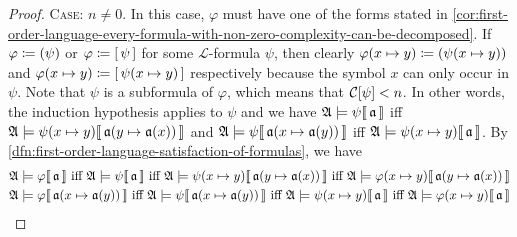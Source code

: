 \begin{proof}
    \vspace{0.3cm}
    \noindent
    {\scshape Case:} \( n \neq 0 \). In this case, \( \varphi \) must have one of the forms stated in \cref{cor:first-order-language-every-formula-with-non-zero-complexity-can-be-decomposed}.
    If \( \varphi \coloneq \mleft( \psi \mright) \) or \( \varphi \coloneq \mleft[ \,\psi\, \mright] \) for some \( \mathcal{L} \)-formula \( \psi \), then clearly
    \( \folfreevariablereplacement{\varphi}{x}{y} \coloneq \mleft( \folfreevariablereplacement{\psi}{x}{y} \mright) \) and
    \( \folfreevariablereplacement{\varphi}{x}{y} \coloneq \mleft[ \,\folfreevariablereplacement{\psi}{x}{y}\, \mright] \)
    respectively because the symbol \( x \) can only occur in \( \psi \).
    Note that \( \psi \) is a subformula of \( \varphi \), which means that \( \folcomplexityofformula{\psi} < n \).
    In other words, the induction hypothesis applies to \( \psi \) and we have
    \(  \mathfrak{A} \models \psi\llbracket\, \mathfrak{a} \,\rrbracket \) iff
    \( \folwffsatisfaction{\mathfrak{A}}{ \folfreevariablereplacement{\psi}{x}{y} }{ \folmodifiedvariableassignmentfunction{\mathfrak{a}}{y}{\mathfrak{a}(x)} } \)
    and
    \( \folwffsatisfaction{\mathfrak{A}}{\psi}{ \folmodifiedvariableassignmentfunction{\mathfrak{a}}{x}{\mathfrak{a}(y)} } \) iff
    \( \folwffsatisfaction{ \mathfrak{A} }{ \folfreevariablereplacement{\psi}{x}{y} }{\mathfrak{a}} \).
    By \cref{dfn:first-order-language-satisfaction-of-formulas}, we have
    \begin{gather*}
        \folwffsatisfaction{\mathfrak{A}}{\varphi}{\mathfrak{a}} \ \text{iff} \ \folwffsatisfaction{\mathfrak{A}}{\psi}{\mathfrak{a}} \ \text{iff}
        \  \folwffsatisfaction{\mathfrak{A}}{ \folfreevariablereplacement{\psi}{x}{y} }{ \folmodifiedvariableassignmentfunction{\mathfrak{a}}{y}{\mathfrak{a}(x)} }
        \ \text{iff}
        \  \folwffsatisfaction{\mathfrak{A}}{ \folfreevariablereplacement{\varphi}{x}{y} }{ \folmodifiedvariableassignmentfunction{\mathfrak{a}}{y}{\mathfrak{a}(x)} }\\
        \folwffsatisfaction{\mathfrak{A}}{\varphi}{ \folmodifiedvariableassignmentfunction{\mathfrak{a}}{x}{\mathfrak{a}(y)} } \ \text{iff}
        \ \folwffsatisfaction{\mathfrak{A}}{\psi}{ \folmodifiedvariableassignmentfunction{\mathfrak{a}}{x}{\mathfrak{a}(y)} } \ \text{iff}
        \ \folwffsatisfaction{ \mathfrak{A} }{ \folfreevariablereplacement{\psi}{x}{y} }{\mathfrak{a}} \ \text{iff}
        \ \folwffsatisfaction{ \mathfrak{A} }{ \folfreevariablereplacement{\varphi}{x}{y} }{\mathfrak{a}}
    \end{gather*}


\end{proof}
